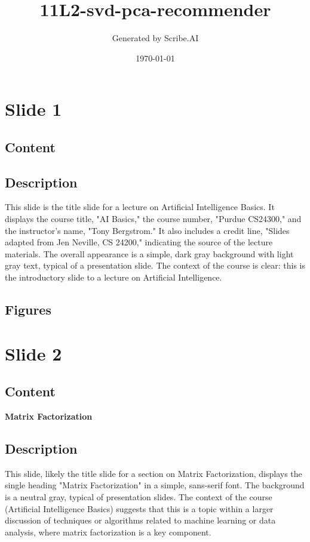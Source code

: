 \documentclass{article}%
\title{11L2{-}svd{-}pca{-}recommender}%
\author{Generated by Scribe.AI}%
\date{\today}%
\begin{document}
%
\normalsize%
\maketitle%
\section{Slide 1}%
\label{sec:Slide1}%
\subsection{Content}%
%
\subsection{Description}%
This slide is the title slide for a lecture on Artificial Intelligence Basics.  It displays the course title, "AI Basics," the course number, "Purdue CS24300," and the instructor's name, "Tony Bergstrom."  It also includes a credit line, "Slides adapted from Jen Neville, CS 24200," indicating the source of the lecture materials.  The overall appearance is a simple, dark gray background with light gray text, typical of a presentation slide. The context of the course is clear: this is the introductory slide to a lecture on Artificial Intelligence.%
\subsection{Figures}%
\begin{figure}[H]%
\centering%
\end{figure}

%
\newpage%
\section{Slide 2}%
\label{sec:Slide2}%
\subsection{Content}%

\textbf{Matrix Factorization}
%
\subsection{Description}%
This slide, likely the title slide for a section on Matrix Factorization, displays the single heading "Matrix Factorization" in a simple, sans-serif font.  The background is a neutral gray, typical of presentation slides.  The context of the course (Artificial Intelligence Basics) suggests that this is a topic within a larger discussion of techniques or algorithms related to machine learning or data analysis, where matrix factorization is a key component.%
\end{document}

